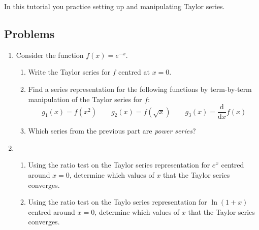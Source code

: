 		\begin{objectives}
			In this tutorial you practice setting up and manipulating Taylor series.
		\end{objectives}

\subsection*{Problems}

\begin{enumerate}
    \item Consider the function $f(x)=e^{-x}$. 
    
    \begin{enumerate}
        \item Write the Taylor series for $f$ centred at $x=0$.
        \item Find a series representation for the following functions by term-by-term manipulation of the Taylor series for $f$:
        \[
            g_1(x)=f(x^2)\qquad g_2(x)=f(\sqrt{x})\qquad g_3(x)=\frac{\mathrm d}{\mathrm d x}f(x)
        \]
        \item Which series from the previous part are \emph{power series}?

    \end{enumerate}

    \item 
    \begin{enumerate}
        \item Using the ratio test on the Taylor series  representation for $e^x$ centred around $x=0$, determine which values of $x$ that the Taylor series converges.
        \item Using the ratio test on the Taylo series representation for $\ln{(1+x)}$ centred around $x=0$, determine which values of $x$ that the Taylor series converges.
    \end{enumerate}


\end{enumerate}
